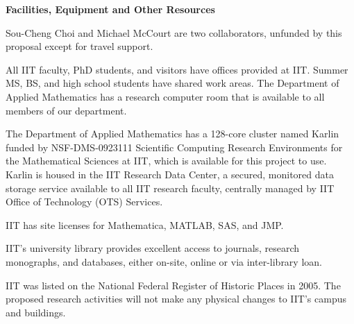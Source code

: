 \documentclass[11pt]{NSFamsart}
\begin{document}

\centerline{\large \bf Facilities, Equipment and Other Resources}

\bigskip

Sou-Cheng Choi and Michael McCourt are two collaborators, unfunded by this proposal except for travel support. 

All IIT faculty, PhD students, and visitors have offices provided at IIT.  Summer MS, BS, and high school students have shared work areas.  The Department of Applied Mathematics has a research computer room that is available to all members of our department.  

The Department of Applied Mathematics has a 128-core cluster named Karlin funded by NSF-DMS-0923111 Scientific Computing Research Environments for the Mathematical Sciences at IIT, which is available for this project to use.  Karlin is housed in the IIT Research Data Center, a secured, monitored data storage service available to all IIT research faculty, centrally managed by IIT Office of Technology (OTS) Services.

IIT has site licenses for Mathematica, MATLAB, SAS, and JMP.

IIT’s university library provides excellent access to journals, research monographs, and databases, either on-site, online or via inter-library loan.

IIT was listed on the National Federal Register of Historic Places in 2005. The proposed research activities will not make any physical changes to IIT’s campus and buildings.
\end{document}
